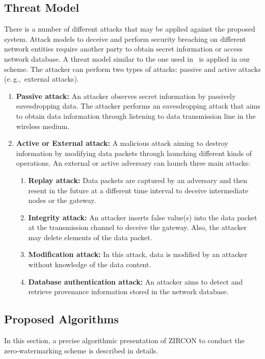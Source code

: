 \documentclass{llncs}
\newcommand{\eg}{e.\,g.,~}
\begin{document}
\subsection{Threat Model} \label{sec:threat}

There is a number of different attacks that may be applied against the proposed system. Attack models to deceive and perform security breaching on different network entities require another party to obtain secret information or access network database. A threat model similar to the one used in~\cite{Cui2018} is applied in our scheme. The attacker can perform two types of attacks: passive and active attacks (\eg external attacks).
\begin{enumerate}
    \item \textbf{Passive attack:} An attacker observes secret information by passively eavesdropping data. The attacker performs an eavesdropping attack that aims to obtain data information through listening to data transmission line in the wireless medium.
    \item \textbf{Active or External attack:} A malicious attack aiming to destroy information by modifying data packets through launching different kinds of operations. An external or active adversary can launch three main attacks: 
    \begin{enumerate}
        \item \textbf{Replay attack:} Data packets are captured by an adversary and then resent in the future at a different time interval to deceive intermediate nodes or the gateway.
        \item \textbf{Integrity attack:} An attacker inserts false value(s) into the data packet at the transmission channel to deceive the gateway. Also, the attacker may delete elements of the data packet. 
        \item \textbf{Modification attack:} In this attack, data is modified by an attacker without knowledge of the data content.
        \item \textbf{Database authentication attack:} An attacker aims to detect and retrieve provenance information stored in the network database.
    \end{enumerate}
\end{enumerate}


\subsection{Proposed Algorithms}
In this section, a precise algorithmic presentation of ZIRCON to conduct the zero-watermarking scheme is described in details. 
\end{document}
